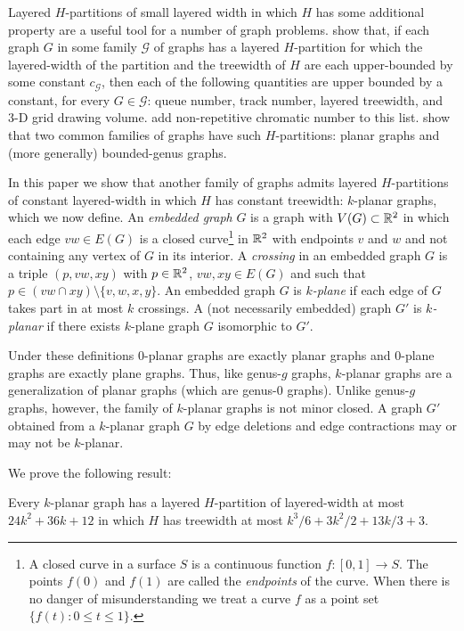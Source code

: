 \documentclass{patmorin}
\newcommand{\treewidth}{\ensuremath{k^3/6 + 3k^2/2 + 13k/3 + 3}}
\begin{document}
Layered $H$-partitions of small layered width in which $H$ has some additional property are a useful tool for a number of graph problems. \citet{dujmovic.joret.ea:planar} show that, if each graph $G$ in some family $\mathcal{G}$ of graphs has a layered $H$-partition for which the layered-width of the partition and the treewidth of $H$ are each upper-bounded by some constant $c_\mathcal{G}$, then each of the following quantities are upper bounded by a constant, for every $G\in\mathcal{G}$: queue number, track number, layered treewidth, and 3-D grid drawing volume. \citet{dujmovic.esperet.ea:planar} add non-repetitive chromatic number to this list.  \citet{dujmovic.joret.ea:planar} show that two common families of graphs have such $H$-partitions: planar graphs and (more generally) bounded-genus graphs.

In this paper we show that another family of graphs admits layered $H$-partitions of constant layered-width in which $H$ has constant treewidth: $k$-planar graphs, which we now define. An \emph{embedded graph} $G$ is a graph with $V(G)\subset\mathbb{R}^2$ in which each edge $vw\in E(G)$ is a closed curve\footnote{A closed curve in a surface $S$ is a continuous function $f:[0,1]\to S$. The points $f(0)$ and $f(1)$ are called the \emph{endpoints} of the curve.  When there is no danger of misunderstanding we treat a curve $f$ as a point set $\{f(t):0\le t\le 1\}$.} in $\mathbb{R}^2$ with endpoints $v$ and $w$ and not containing any vertex of $G$ in its interior.  A \emph{crossing} in an embedded graph $G$ is a triple $(p,vw,xy)$ with $p\in\mathbb{R}^2$, $vw,xy\in E(G)$ and such that $p\in (vw\cap xy)\setminus\{v,w,x,y\}$. An embedded graph $G$ is \emph{$k$-plane} if each edge of $G$ takes part in at most $k$ crossings.  A (not necessarily embedded) graph $G'$ is \emph{$k$-planar} if there exists $k$-plane graph $G$ isomorphic to $G'$.  

Under these definitions $0$-planar graphs are exactly planar graphs and $0$-plane graphs are exactly plane graphs. Thus, like genus-$g$ graphs, $k$-planar graphs are a generalization of planar graphs (which are genus-$0$ graphs).  Unlike genus-$g$ graphs, however, the family of $k$-planar graphs is not minor closed. A graph $G'$ obtained from a $k$-planar graph $G$ by edge deletions and edge contractions may or may not be $k$-planar.

We prove the following result:
\begin{thm}
  Every $k$-planar graph has a layered $H$-partition of layered-width at most $24k^2 + 36k + 12$ in which $H$ has treewidth at most $\treewidth$.
\end{thm}
\end{document}
